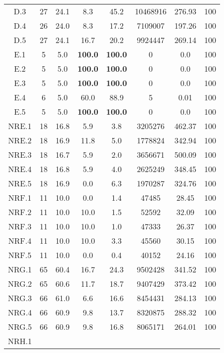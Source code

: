 \begin{longtable}{@{\extracolsep{5pt}}cccccccc}
	D.3 &
		27 & 24.1 &
			8.3
		&
			45.2
		& 10468916 & 276.93 & 100
	\\
	D.4 &
		26 & 24.0 &
			8.3
		&
			17.2
		& 7109007 & 197.26 & 100
	\\
	D.5 &
		27 & 24.1 &
			16.7
		&
			20.2
		& 9924447 & 269.14 & 100
	\\
	E.1 &
		5 & 5.0 &
			\textbf{100.0}
		&
			\textbf{100.0}
		& 0 & 0.0 & 100
	\\
	E.2 &
		5 & 5.0 &
			\textbf{100.0}
		&
			\textbf{100.0}
		& 0 & 0.0 & 100
	\\
	E.3 &
		5 & 5.0 &
			\textbf{100.0}
		&
			\textbf{100.0}
		& 0 & 0.0 & 100
	\\
	E.4 &
		6 & 5.0 &
			60.0
		&
			88.9
		& 5 & 0.01 & 100
	\\
	E.5 &
		5 & 5.0 &
			\textbf{100.0}
		&
			\textbf{100.0}
		& 0 & 0.0 & 100
	\\
	NRE.1 &
		18 & 16.8 &
			5.9
		&
			3.8
		& 3205276 & 462.37 & 100
	\\
	NRE.2 &
		18 & 16.9 &
			11.8
		&
			5.0
		& 1778824 & 342.94 & 100
	\\
	NRE.3 &
		18 & 16.7 &
			5.9
		&
			2.0
		& 3656671 & 500.09 & 100
	\\
	NRE.4 &
		18 & 16.8 &
			5.9
		&
			4.0
		& 2625249 & 348.45 & 100
	\\
	NRE.5 &
		18 & 16.9 &
			0.0
		&
			6.3
		& 1970287 & 324.76 & 100
	\\
	NRF.1 &
		11 & 10.0 &
			0.0
		&
			1.4
		& 47485 & 28.45 & 100
	\\
	NRF.2 &
		11 & 10.0 &
			10.0
		&
			1.5
		& 52592 & 32.09 & 100
	\\
	NRF.3 &
		11 & 10.0 &
			10.0
		&
			1.0
		& 47333 & 26.37 & 100
	\\
	NRF.4 &
		11 & 10.0 &
			10.0
		&
			3.3
		& 45560 & 30.15 & 100
	\\
	NRF.5 &
		11 & 10.0 &
			0.0
		&
			0.4
		& 40152 & 24.16 & 100
	\\
	NRG.1 &
		65 & 60.4 &
			16.7
		&
			24.3
		& 9502428 & 341.52 & 100
	\\
	NRG.2 &
		65 & 60.6 &
			11.7
		&
			18.7
		& 9407429 & 373.42 & 100
	\\
	NRG.3 &
		66 & 61.0 &
			6.6
		&
			16.6
		& 8454431 & 284.13 & 100
	\\
	NRG.4 &
		66 & 60.9 &
			9.8
		&
			13.7
		& 8320875 & 288.32 & 100
	\\
	NRG.5 &
		66 & 60.9 &
			9.8
		&
			16.8
		& 8065171 & 264.01 & 100
	\\
	NRH.1 &

\end{longtable}
